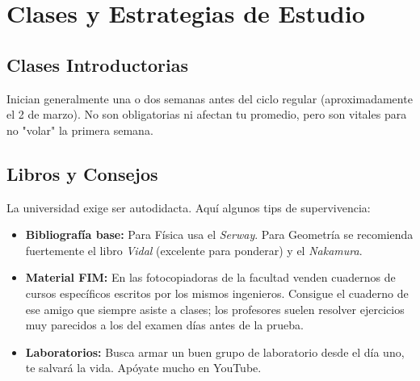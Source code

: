 \section{Clases y Estrategias de Estudio}

\subsection{Clases Introductorias}
Inician generalmente una o dos semanas antes del ciclo regular (aproximadamente el 2 de marzo). No son obligatorias ni afectan tu promedio, pero son vitales para no "volar" la primera semana.

\subsection{Libros y Consejos}
La universidad exige ser autodidacta. Aquí algunos tips de supervivencia:
\begin{itemize}
    \item \textbf{Bibliografía base:} Para Física usa el \textit{Serway}. Para Geometría se recomienda fuertemente el libro \textit{Vidal} (excelente para ponderar) y el \textit{Nakamura}. 
    \item \textbf{Material FIM:} En las fotocopiadoras de la facultad venden cuadernos de cursos específicos escritos por los mismos ingenieros. Consigue el cuaderno de ese amigo que siempre asiste a clases; los profesores suelen resolver ejercicios muy parecidos a los del examen días antes de la prueba.
    \item \textbf{Laboratorios:} Busca armar un buen grupo de laboratorio desde el día uno, te salvará la vida. Apóyate mucho en YouTube.
\end{itemize}
